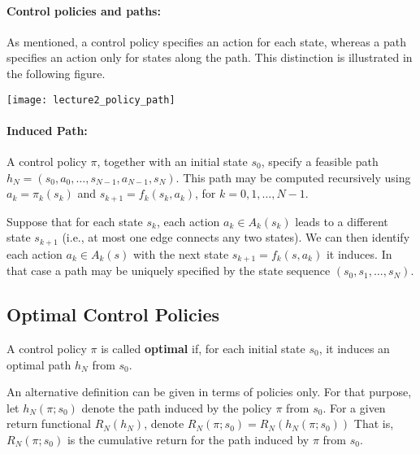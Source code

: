 \paragraph{Control policies and paths:} As mentioned, a control policy specifies an action for each state, whereas a path specifies an action only for states along the path. This distinction is illustrated in the following figure.

\begin{centering}
\texttt{[image: lecture2\_policy\_path]}\\
\end{centering}

\paragraph{Induced Path:} A control policy $\pi $, together with an initial state ${s_0}$, specify a feasible path ${h_N} = ({s_0},{a_0}, \ldots ,{s_{N - 1}},{a_{N - 1}},{s_N})$. This path may be computed recursively using ${a_k} = {\pi _k}({s_k})$ and ${s_{k + 1}} = {f_k}({s_k},{a_k})$, for $k = 0,1, \ldots ,N - 1$.

\begin{remark} Suppose that for each state ${s_k}$, each action ${a_k} \in {A_k}({s_k})$ leads to a different state ${s_{k + 1}}$ (i.e., at most one edge connects any two states). We can then identify each action ${a_k} \in {A_k}(s)$ with the next state ${s_{k + 1}} = {f_k}(s,{a_k})$ it induces. In that case a path may be uniquely specified by the state sequence $({s_0},{s_1}, \ldots ,{s_N})$.
\end{remark}

\subsection{Optimal Control Policies}

\begin{definition} A control policy $\pi $ is called \textbf{optimal} if, for each initial state ${s_0}$, it induces an optimal path ${h_N}$ from ${s_0}$.
\end{definition}

An alternative definition can be given in terms of policies only. For that purpose, let ${h_N}(\pi ;{s_0})$ denote the path induced by the policy $\pi $ from ${s_0}$.  For a given return  functional ${R_N}({h_N})$, denote
${R_N}(\pi ;{s_0}) = {R_N}({h_N}(\pi ;{s_0}))$
That is, ${R_N}(\pi ;{s_0})$ is the cumulative return for the path induced by $\pi $ from ${s_0}$.

